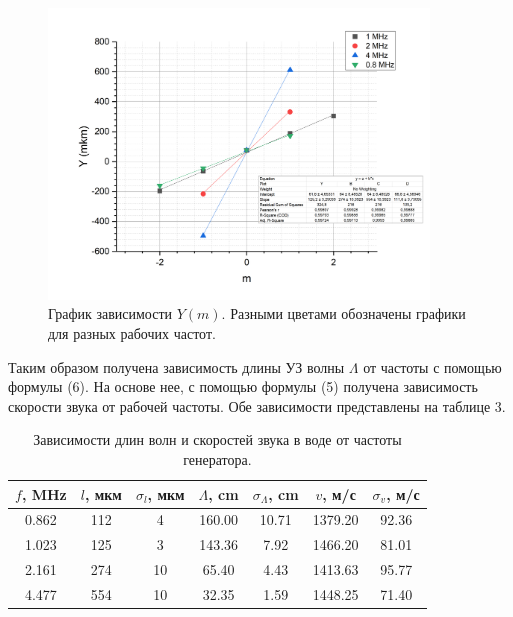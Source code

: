 \documentclass[a4paper, 14pt]{extarticle}%
\newcommand\ECaption[1]{%
     \captionsetup{font=footnotesize}%
     \caption{#1}}
\begin{document}
\begin{figure}[h]
\begin{center}
\includegraphics[width=0.9\textwidth]{gr1}
\end{center}
\ECaption{График зависимости $Y(m)$. Разными цветами обозначены графики для разных рабочих частот.}
\end{figure}

Таким образом получена зависимость длины УЗ волны $\Lambda$ от частоты с помощью формулы (6). На основе нее, с помощью формулы (5) получена зависимость скорости звука от рабочей частоты. Обе зависимости представлены на таблице 3.

\begin{table}[h!]
\begin{center}

\begin{tabular}{|c|c|c|c|c|c|c|}
\hline
\rowcolor[HTML]{9698ED} 
$f$, MHz    & $l$, мкм   & $\sigma_{l}$, мкм & $\Lambda$, cm      & $\sigma_{\Lambda}$, cm    & $v$, м/с       & $\sigma_v$, м/с    \\ \hline
0.862 & 112 & 4  & 160.00 & 10.71 & 1379.20 & 92.36 \\ \hline
\rowcolor[HTML]{9698ED} 
1.023 & 125 & 3  & 143.36 & 7.92  & 1466.20 & 81.01 \\ \hline
2.161 & 274 & 10 & 65.40  & 4.43  & 1413.63 & 95.77 \\ \hline
\rowcolor[HTML]{9698ED} 
4.477 & 554 & 10 & 32.35  & 1.59  & 1448.25 & 71.40 \\ \hline
\end{tabular}
\ECaption{Зависимости длин волн и скоростей звука в воде от частоты генератора. }
\end{center}
\end{table}
\end{document}
